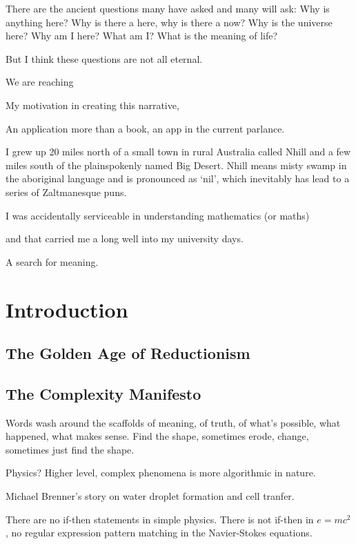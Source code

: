 There are the ancient questions many have asked and many will ask: 
Why is anything here?  Why is there a here, why is there a now?
Why is the universe here?  Why am I here?  What am I?  What is the meaning of life?

But I think these questions are not all eternal.  

We are reaching



My motivation in creating this narrative, 


An application more than a book, an app in the current parlance.

I grew up 20 miles north of a small town in rural Australia
called Nhill and a few miles south of the plainspokenly named Big
Desert.
Nhill means misty swamp in the aboriginal language and is pronounced
as `nil', which inevitably has lead to a series of Zaltmanesque puns.



I was accidentally serviceable in understanding mathematics (or maths)

and that carried me a long well into my university days.

A search for meaning.

\section{Introduction}


\subsection{The Golden Age of Reductionism}


\subsection{The Complexity Manifesto}


Words wash around the scaffolds of meaning, of truth,
of what's possible, what happened, what makes sense.
Find the shape, sometimes erode, change,
sometimes just find the shape.




Physics?
Higher level, complex phenomena is more algorithmic in nature.

Michael Brenner's story on water droplet formation
and cell tranfer.

There are no if-then statements in simple physics.
There is not if-then in $e=mc^2$, no regular
expression pattern matching in the Navier-Stokes equations.


